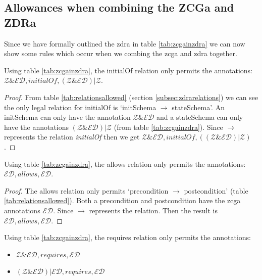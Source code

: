 \subsection{Allowances when combining the ZCGa and ZDRa}

Since we have formally outlined the \gls{zdra} in table \ref{tab:zcgainzdra} we can now show some rules which occur when we combing the \gls{zcga} and \gls{zdra} together.

\begin{thm}
Using table \ref{tab:zcgainzdra}, the initialOf relation only permits the annotations: \\
 $\mathcal{Z} \& \mathcal{ED}, initialOf, (\mathcal{Z} \& \mathcal{ED}) | \mathcal{Z}$.
\end{thm}

\begin{proof}
From table \ref{tab:relationsallowed} (section \ref{subsec:zdrarelations}) we can see the only legal relation for initialOf is `initSchema $\longrightarrow$ stateSchema'. An initSchema can only have the annotation $\mathcal{Z} \& \mathcal{ED}$ and a stateSchema can only have the annotations $(\mathcal{Z} \& \mathcal{ED}) | \mathcal{Z}$ (from table \ref{tab:zcgainzdra}). Since $\longrightarrow$ represents the relation \emph{initialOf} then we get $\mathcal{Z} \& \mathcal{ED}, initialOf, ((\mathcal{Z} \& \mathcal{ED}) | \mathcal{Z})$.
\end{proof}

\begin{thm}
Using table \ref{tab:zcgainzdra}, the allows relation only permits the annotations: \\
$\mathcal{ED}, allows, \mathcal{ED}$.
\end{thm}

\begin{proof}
The allows relation only permits `precondition $\longrightarrow$ postcondition' (table \ref{tab:relationsallowed}). Both a precondition and postcondition have the \gls{zcga} annotations $\mathcal{ED}$. Since $\longrightarrow$ represents the relation. Then the result is $\mathcal{ED}, allows, \mathcal{ED}$.
\end{proof}

\begin{thm}
Using table \ref{tab:zcgainzdra}, the requires relation only permits the annotations:
\begin{itemize}
\item $\mathcal{Z} \& \mathcal{ED}, requires, \mathcal{ED}$
\item $(\mathcal{Z} \& \mathcal{ED}) | \mathcal{ED}, requires, \mathcal{ED}$
\end{itemize}
\end{thm}

